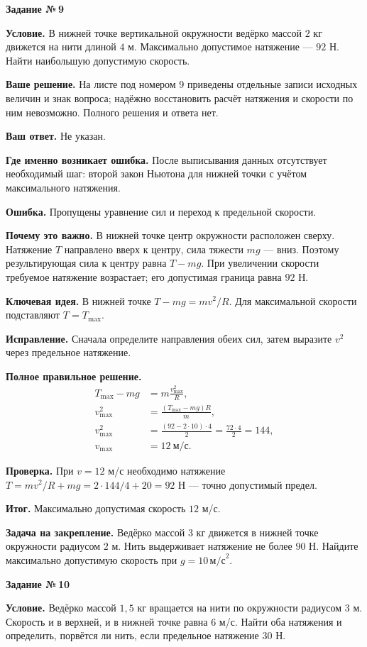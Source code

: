 \documentclass[a4paper,11pt]{article}
\newcommand{\keyidea}{\textcolor{accent}{\textbf{Ключевая идея.}}}
\newcommand{\mistake}{\textcolor{error}{\textbf{Ошибка.}}}
\newcommand{\result}{\textcolor{accent}{\textbf{Итог.}}}
\newcommand{\taskhead}[1]{\phantomsection\label{task:#1}\begin{center}{\Large\bfseries\color{ink}Задание №\,#1}\end{center}\vspace{3pt}}
\newcommand{\field}[1]{\par\vspace{2pt}\textbf{#1}\quad}
\begin{document}
\taskhead{9}
\field{Условие.} В нижней точке вертикальной окружности ведёрко массой $2$ кг движется на нити длиной $4$ м. Максимально допустимое натяжение --- $92$ Н. Найти наибольшую допустимую скорость.

\field{Ваше решение.} На листе под номером 9 приведены отдельные записи исходных величин и знак вопроса; надёжно восстановить расчёт натяжения и скорости по ним невозможно. Полного решения и ответа нет.

\field{Ваш ответ.} Не указан.

\field{Где именно возникает ошибка.} После выписывания данных отсутствует необходимый шаг: второй закон Ньютона для нижней точки с учётом максимального натяжения.

\mistake{} Пропущены уравнение сил и переход к предельной скорости.

\field{Почему это важно.} В нижней точке центр окружности расположен сверху. Натяжение $T$ направлено вверх к центру, сила тяжести $mg$ --- вниз. Поэтому результирующая сила к центру равна $T-mg$. При увеличении скорости требуемое натяжение возрастает; его допустимая граница равна $92$ Н.

\keyidea{} В нижней точке $T-mg=mv^2/R$. Для максимальной скорости подставляют $T=T_{\max}$.

\field{Исправление.} Сначала определите направления обеих сил, затем выразите $v^2$ через предельное натяжение.

\field{Полное правильное решение.}
\begin{align*}
T_{\max}-mg&=m\frac{v_{\max}^2}{R},\\
v_{\max}^2&=\frac{(T_{\max}-mg)R}{m},\\
v_{\max}^2&=\frac{(92-2\cdot10)\cdot4}{2}
=\frac{72\cdot4}{2}=144,\\
v_{\max}&=\boxed{12\ \text{м/с}}.
\end{align*}
\field{Проверка.} При $v=12$ м/с необходимо натяжение $T=mv^2/R+mg=2\cdot144/4+20=92$ Н --- точно допустимый предел.

\result{} Максимально допустимая скорость $12$ м/с.

\field{Задача на закрепление.} Ведёрко массой $3$ кг движется в нижней точке окружности радиусом $2$ м. Нить выдерживает натяжение не более $90$ Н. Найдите максимально допустимую скорость при $g=10\,\text{м/с}^2$.
\clearpage

\taskhead{10}
\field{Условие.} Ведёрко массой $1{,}5$ кг вращается на нити по окружности радиусом $3$ м. Скорость и в верхней, и в нижней точке равна $6$ м/с. Найти оба натяжения и определить, порвётся ли нить, если предельное натяжение $30$ Н.
\end{document}
